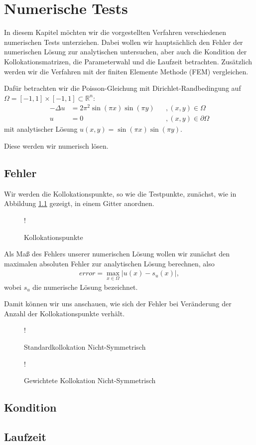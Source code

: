\chapter{Numerische Tests}
\label{cha:NumerischeTests}

In diesem Kapitel möchten wir die vorgestellten Verfahren verschiedenen numerischen Tests unterziehen. Dabei wollen wir hauptsächlich den Fehler der numerischen Lösung zur analytischen untersuchen, aber auch die Kondition der Kollokationsmatrizen, die Parameterwahl und die Laufzeit betrachten. Zusätzlich werden wir die Verfahren mit der finiten Elemente Methode (\acs{FEM}) vergleichen.

Dafür betrachten wir die Poisson-Gleichung mit Dirichlet-Randbedingung auf $\Omega = [-1,1] \times [-1,1] \subset \mathbb{R}^n$:
\begin{align*}
- \Delta u &= 2\pi^2 \sin(\pi x)\sin(\pi y)&&, (x,y) \in \Omega\\
u &= 0&&, (x,y) \in \partial \Omega
\end{align*}
mit analytischer Lösung $u(x,y) = \sin(\pi x)\sin(\pi y)$.

Diese werden wir numerisch lösen.

\section{Fehler}
Wir werden die Kollokationspunkte, so wie die Testpunkte, zunächst, wie in Abbildung \ref{fig:Kollok} gezeigt, in einem Gitter anordnen.
\begin{figure}[h]
\centering
\resizebox {.8\columnwidth} {!} {

}
\caption{Kollokationspunkte}
\label{fig:Kollok}
\end{figure}
Als Maß des Fehlers unserer numerischen Lösung wollen wir zunächst den maximalen absoluten Fehler zur analytischen Lösung berechnen, also
\begin{align*}
error = \max_{x \in \Omega} |u(x) - s_u (x)|,
\end{align*}
wobei $s_u$ die numerische Lösung bezeichnet.

Damit können wir uns anschauen, wie sich der Fehler bei Veränderung der Anzahl der Kollokationspunkte verhält.
\begin{figure}[h]
\centering
\resizebox {\columnwidth} {!} {

}
\caption{Standardkollokation Nicht-Symmetrisch}
\label{fig:standard error abs n-sym}
\end{figure}

\begin{figure}[h]
\centering
\resizebox {\columnwidth} {!} {

}
\caption{Gewichtete Kollokation Nicht-Symmetrisch}
\label{fig:weighted error abs n-sym}
\end{figure}




\section{Kondition}
\section{Laufzeit}